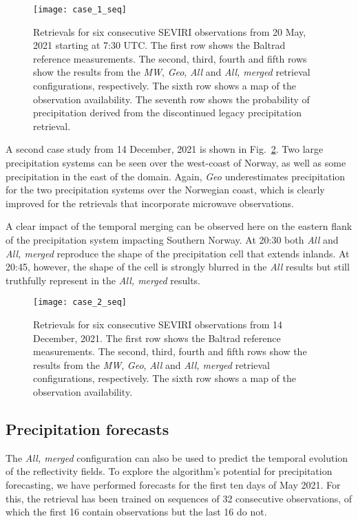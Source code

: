\documentclass[11pt]{scrartcl}
\begin{document}
\begin{figure}
  \centering
  \texttt{[image: case\_1\_seq]}
  \caption{
    Retrievals for six consecutive SEVIRI observations from 20 May, 2021
    starting at 7:30 UTC. The first row shows the Baltrad reference
    measurements. The second, third, fourth and fifth rows show the results from
    the \textit{MW}, \textit{Geo}, \textit{All} and \textit{All, merged}
    retrieval configurations, respectively. The sixth row shows a map of the
    observation availability. The seventh row shows the probability of
    precipitation derived from the discontinued legacy precipitation retrieval.
  }
  \label{fig:case_1_seq}
\end{figure}

A second case study from 14 December, 2021 is shown in Fig.~\ref{fig:case_2_seq}.
Two large precipitation systems can be seen over the west-coast of Norway, as well
as some precipitation in the east of the domain. Again, \textit{Geo} underestimates
precipitation for the two precipitation systems over the Norwegian coast, which is
clearly improved for the retrievals that incorporate microwave observations.

A clear impact of the temporal merging can be observed here on the eastern flank
of the precipitation system impacting Southern Norway. At 20:30 both
\textit{All} and \textit{All, merged} reproduce the shape of the precipitation
cell that extends inlands. At 20:45, however, the shape of the cell is strongly
blurred in the \textit{All} results but still truthfully represent in the
\textit{All, merged} results.



\begin{figure}
  \centering
  \texttt{[image: case\_2\_seq]}
  \caption{
    Retrievals for six consecutive SEVIRI observations from 14 December, 2021.
    The first row shows the Baltrad reference measurements. The second, third,
    fourth and fifth rows show the results from the \textit{MW}, \textit{Geo},
    \textit{All} and \textit{All, merged} retrieval configurations,
    respectively. The sixth row shows a map of the observation availability.
  }
  \label{fig:case_2_seq}
\end{figure}

\subsection{Precipitation forecasts}

The \textit{All, merged} configuration can also be used to predict the temporal evolution of the reflectivity fields. To explore the algorithm's potential for precipitation forecasting, we have performed forecasts for the first ten days of May 2021. For this, the retrieval has been trained on sequences of 32 consecutive observations, of which the first 16 contain observations but the last 16 do not.
\end{document}
